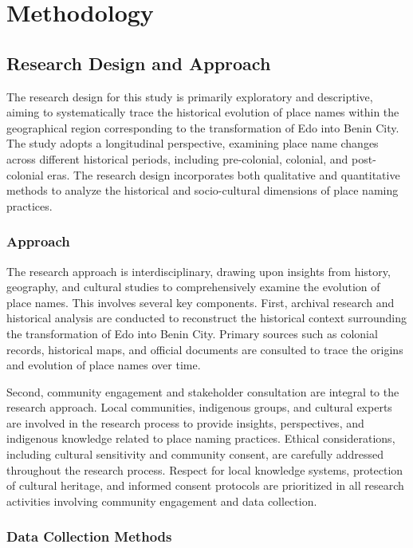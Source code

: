\chapter{Methodology}

\section{Research Design and Approach}

The research design for this study is primarily exploratory and descriptive, aiming to systematically trace the historical evolution of place names within the geographical region corresponding to the transformation of Edo into Benin City. The study adopts a longitudinal perspective, examining place name changes across different historical periods, including pre-colonial, colonial, and post-colonial eras. The research design incorporates both qualitative and quantitative methods to analyze the historical and socio-cultural dimensions of place naming practices.

\subsection{Approach}

The research approach is interdisciplinary, drawing upon insights from history, geography, and cultural studies to comprehensively examine the evolution of place names. This involves several key components. First, archival research and historical analysis are conducted to reconstruct the historical context surrounding the transformation of Edo into Benin City. Primary sources such as colonial records, historical maps, and official documents are consulted to trace the origins and evolution of place names over time.

Second, community engagement and stakeholder consultation are integral to the research approach. Local communities, indigenous groups, and cultural experts are involved in the research process to provide insights, perspectives, and indigenous knowledge related to place naming practices. Ethical considerations, including cultural sensitivity and community consent, are carefully addressed throughout the research process. Respect for local knowledge systems, protection of cultural heritage, and informed consent protocols are prioritized in all research activities involving community engagement and data collection.

\subsection{Data Collection Methods}


